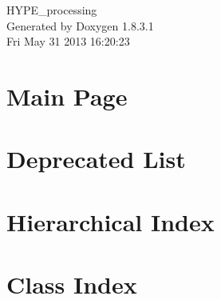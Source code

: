 \documentclass{book}
\begin{document}
\hypersetup{pageanchor=false,citecolor=blue}
\begin{titlepage}
\vspace*{7cm}
\begin{center}
{\Large H\-Y\-P\-E\-\_\-processing }\\
\vspace*{1cm}
{\large Generated by Doxygen 1.8.3.1}\\
\vspace*{0.5cm}
{\small Fri May 31 2013 16:20:23}\\
\end{center}
\end{titlepage}
\clearemptydoublepage
{}
\tableofcontents
\clearemptydoublepage
{}
\hypersetup{pageanchor=true,citecolor=blue}
\chapter{Main Page}
\label{index}\hypertarget{index}{}
\chapter{Deprecated List}
\label{deprecated}
\hypertarget{deprecated}{}

\chapter{Hierarchical Index}

\chapter{Class Index}

\end{document}
